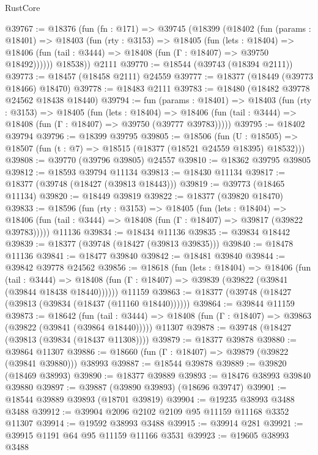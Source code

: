 \begin{lexlean}{RustCore}
\begin{coremodule}
@39767 := @18376
    (fun (fn : @171) =>
    @39745
      (@18399
        (@18402
          (fun (params : @18401) =>
          @18403
            (fun (rty : @3153) =>
            @18405
              (fun (lets : @18404) =>
              @18406 (fun (tail : @3444) => @18408 (fun (Γ : @18407) => @39750 @18492))))))
        @18538))
    @2111
@39770 := @18544 (@39743 (@18394 @2111))
@39773 := @18457 (@18458 @2111) @24559
@39777 := @18377 (@18449 (@39773 @18466) @18470)
@39778 := @18483 @2111
@39783 := @18480 (@18482 @39778 @24562 @18438 @18440)
@39794 := fun (params : @18401) =>
  @18403
    (fun (rty : @3153) =>
    @18405
      (fun (lets : @18404) =>
      @18406 (fun (tail : @3444) => @18408 (fun (Γ : @18407) => @39750 (@39777 @39783)))))
@39795 := @18402 @39794
@39796 := @18399 @39795
@39805 := @18506
    (fun (U : @18505) => @18507 (fun (t : @7) => @18515 (@18377 (@18521 @24559 @18395) @18532)))
@39808 := @39770 (@39796 @39805) @24557
@39810 := @18362 @39795 @39805
@39812 := @18593 @39794 @11134
@39813 := @18430 @11134
@39817 := @18377 (@39748 (@18427 (@39813 @18443)))
@39819 := @39773 (@18465 @11134)
@39820 := @18449 @39819
@39822 := @18377 (@39820 @18470)
@39833 := @18596
    (fun (rty : @3153) =>
    @18405
      (fun (lets : @18404) =>
      @18406 (fun (tail : @3444) => @18408 (fun (Γ : @18407) => @39817 (@39822 @39783)))))
    @11136
@39834 := @18434 @11136
@39835 := @39834 @18442
@39839 := @18377 (@39748 (@18427 (@39813 @39835)))
@39840 := @18478 @11136
@39841 := @18477 @39840
@39842 := @18481 @39840
@39844 := @39842 @39778 @24562
@39856 := @18618
    (fun (lets : @18404) =>
    @18406
      (fun (tail : @3444) =>
      @18408 (fun (Γ : @18407) => @39839 (@39822 (@39841 (@39844 @18438 @18440))))))
    @11159
@39863 := @18377 (@39748 (@18427 (@39813 (@39834 (@18437 (@11160 @18440))))))
@39864 := @39844 @11159
@39873 := @18642
    (fun (tail : @3444) => @18408 (fun (Γ : @18407) => @39863 (@39822 (@39841 (@39864 @18440)))))
    @11307
@39878 := @39748 (@18427 (@39813 (@39834 (@18437 @11308))))
@39879 := @18377 @39878
@39880 := @39864 @11307
@39886 := @18660 (fun (Γ : @18407) => @39879 (@39822 (@39841 @39880))) @38993
@39887 := @18544 @39878
@39889 := @39820 (@18469 @38993)
@39890 := @18377 @39889
@39893 := @18476 @38993 @39840 @39880
@39897 := @39887 (@39890 @39893) (@18696 @39747)
@39901 := @18544 @39889 @39893 (@18701 @39819)
@39904 := @19235 @38993 @3488 @3488
@39912 := @39904 @2096 @2102 @2109 @95 @11159 @11168 @3352 @11307
@39914 := @19592 @38993 @3488
@39915 := @39914 @281
@39921 := @39915 @1191 @64 @95 @11159 @11166 @3531
@39923 := @19605 @38993 @3488

\end{coremodule}
\end{lexlean}

